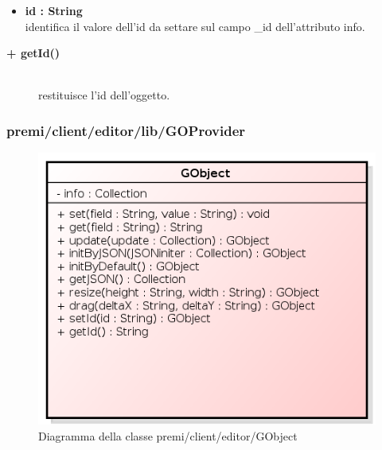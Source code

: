 \begin{description}
\begin{description}
\begin{description}
\begin{itemize}
					\item \textbf{id : String			} \hfill \\
					identifica il valore dell'id da settare sul campo \_id dell'attributo info.
				\end{itemize}
		\end{description}
		
\end{description}

\begin{description}
		\item[\textbf{+ getId()			}] \hfill \\
			restituisce l'id dell'oggetto.
\end{description}


\end{description}

\subsubsection{premi/client/editor/lib/GOProvider}
\begin{figure}[h]
\begin{center}
\includegraphics[scale=0.40]{img/diacla/GObject.png}
\caption{Diagramma della classe premi/client/editor/GObject}
\end{center}
\end{figure}


